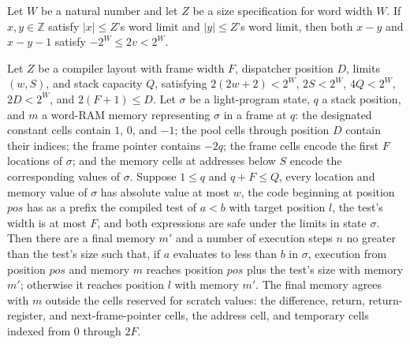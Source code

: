 \begin{theorem}
\label{Light.Compiler.inRange_sub}
\leanok
{}
Let $W$ be a natural number and let $Z$ be a size specification for word width $W$. If
$x,y\in\mathbb{Z}$ satisfy $|x|\le Z$'s word limit and $|y|\le Z$'s word limit, then
both $x-y$ and $x-y-1$ satisfy $-2^W\le 2v<2^W$.
\end{theorem}

\begin{theorem}
\label{Light.Compiler.decides_lt}
\leanok
{}
Let $Z$ be a compiler layout with frame width $F$, dispatcher position $D$, limits
$(w,S)$, and stack capacity $Q$, satisfying $2(2w+2)<2^W$, $2S<2^W$, $4Q<2^W$, $2D<2^W$,
and $2(F+1)\le D$. Let $\sigma$ be a light-program state, $q$ a stack position, and $m$
a word-RAM memory representing $\sigma$ in a frame at $q$: the designated constant cells
contain $1$, $0$, and $-1$; the pool cells through position $D$ contain their indices;
the frame pointer contains $-2q$; the frame cells encode the first $F$ locations of
$\sigma$; and the memory cells at addresses below $S$ encode the corresponding values of
$\sigma$. Suppose $1\le q$ and $q+F\le Q$, every location and memory value of $\sigma$
has absolute value at most $w$, the code beginning at position $pos$ has as a prefix the
compiled test of $a<b$ with target position $l$, the test's width is at most $F$, and
both expressions are safe under the limits in state $\sigma$. Then there are a final
memory $m'$ and a number of execution steps $n$ no greater than the test's size such
that, if $a$ evaluates to less than $b$ in $\sigma$, execution from position $pos$ and
memory $m$ reaches position $pos$ plus the test's size with memory $m'$; otherwise it
reaches position $l$ with memory $m'$. The final memory agrees with $m$ outside the
cells reserved for scratch values: the difference, return, return-register, and
next-frame-pointer cells, the address cell, and temporary cells indexed from $0$ through
$2F$.
\end{theorem}

